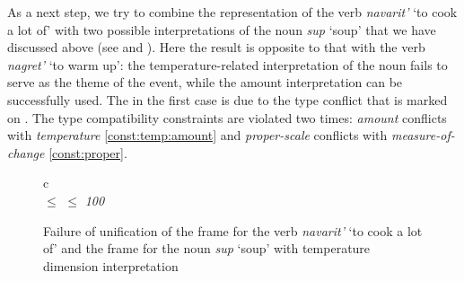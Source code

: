 As a next step, we try to combine the representation of the verb \textit{navarit'} `to cook a lot of' with two possible interpretations of the noun \textit{sup} `soup' that we have discussed above (see  and ). Here the result is opposite to that with the verb \textit{nagret'} `to warm up': the temperature-related interpretation of the noun fails to serve as the theme of the event, while the amount interpretation can be successfully used. The  in the first case is due to the type conflict that is marked on . The type compatibility constraints are violated two times: \textit{amount} conflicts with \textit{temperature} \ref{const:temp:amount} and \textit{proper-scale} conflicts with \textit{measure-of-change} \ref{const:proper}.

\begin{figure}
\begin{tabular}{c}
\\
 $\leq$  $\leq$ \textit{100}
\end{tabular}
\caption{Failure of unification of the frame for the verb \textit{navarit'} `to cook a lot of' and the frame for the noun \textit{sup} `soup' with temperature dimension interpretation \label{frame:navarit:soup:temp}}
\end{figure}

